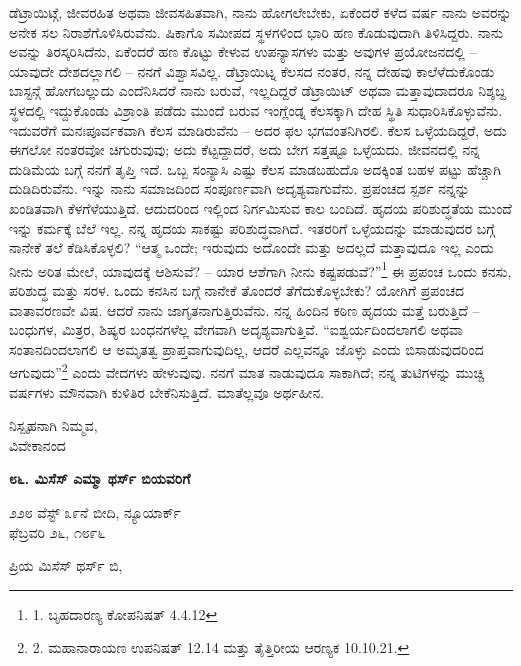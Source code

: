 ಡೆಟ್ರಾಯಿಟ್ಗೆ, ಜೀವರಹಿತ ಅಥವಾ ಜೀವಸಹಿತವಾಗಿ, ನಾನು ಹೋಗಲೇಬೇಕು, ಏಕೆಂದರೆ ಕಳೆದ ವರ್ಷ ನಾನು ಅವರನ್ನು ಅನೇಕ ಸಲ ನಿರಾಶೆಗೊಳಿಸಿರುವೆನು. ಷಿಕಾಗೊ ಸಮೀಪದ ಸ್ಥಳಗಳಿಂದ ಭಾರಿ ಹಣ ಕೊಡುವುದಾಗಿ ತಿಳಿಸಿದ್ದರು. ನಾನು ಅವನ್ನು ತಿರಸ್ಕರಿಸಿದೆನು, ಏಕೆಂದರೆ ಹಣ ಕೊಟ್ಟು ಕೇಳುವ ಉಪನ್ಯಾಸಗಳು ಮತ್ತು ಅವುಗಳ ಪ್ರಯೋಜನದಲ್ಲಿ – ಯಾವುದೇ ದೇಶದಲ್ಲಾಗಲಿ – ನನಗೆ ವಿಶ್ವಾಸವಿಲ್ಲ. ಡೆಟ್ರಾಯಿಟ್ನ ಕೆಲಸದ ನಂತರ, ನನ್ನ ದೇಹವು ಕಾಲೆಳೆದುಕೊಂಡು ಬಾಸ್ಟನ್ಗೆ ಹೋಗಬಲ್ಲುದು ಎಂದೆನಿಸಿದರೆ ನಾನು ಬರುವೆ, ಇಲ್ಲದಿದ್ದರೆ ಡೆಟ್ರಾಯಿಟ್ ಅಥವಾ ಮತ್ತಾವುದಾದರೂ ನಿಶ್ಶಬ್ದ ಸ್ಥಳದಲ್ಲಿ ಇದ್ದುಕೊಂಡು ವಿಶ್ರಾಂತಿ ಪಡೆದು ಮುಂದೆ ಬರುವ ಇಂಗ್ಲೆಂಡ್ನ ಕೆಲಸಕ್ಕಾಗಿ ದೇಹ ಸ್ಥಿತಿ ಸುಧಾರಿಸಿಕೊಳ್ಳುವೆನು. ಇದುವರೆಗೆ ಮನಃಪೂರ್ವಕವಾಗಿ ಕೆಲಸ ಮಾಡಿರುವೆನು – ಅದರ ಫಲ ಭಗವಂತನಿಗಿರಲಿ. ಕೆಲಸ ಒಳ್ಳೆಯದಿದ್ದರೆ, ಅದು ಈಗಲೋ ನಂತರವೋ ಚಿಗುರುವುವು; ಅದು ಕೆಟ್ಟದ್ದಾದರೆ, ಅದು ಬೇಗ ಸತ್ತಷ್ಟೂ ಒಳ್ಳೆಯದು. ಜೀವನದಲ್ಲಿ ನನ್ನ ದುಡಿಮೆಯ ಬಗ್ಗೆ ನನಗೆ ತೃಪ್ತಿ ಇದೆ. ಒಬ್ಬ ಸಂನ್ಯಾಸಿ ಎಷ್ಟು ಕೆಲಸ ಮಾಡಬಹುದೊ ಅದಕ್ಕಿಂತ ಬಹಳ ಪಟ್ಟು ಹೆಚ್ಚಾಗಿ ದುಡಿದಿರುವೆನು. ಇನ್ನು ನಾನು ಸಮಾಜದಿಂದ ಸಂಪೂರ್ಣವಾಗಿ ಅದೃಶ್ಯವಾಗುವೆನು. ಪ್ರಪಂಚದ ಸ್ಪರ್ಶ ನನ್ನನ್ನು ಖಂಡಿತವಾಗಿ ಕೆಳಗೆಳೆಯುತ್ತಿದೆ. ಆದುದರಿಂದ ಇಲ್ಲಿಂದ ನಿರ್ಗಮಿಸುವ ಕಾಲ ಬಂದಿದೆ. ಹೃದಯ ಪರಿಶುದ್ಧತೆಯ ಮುಂದೆ ಇನ್ನು ಕರ್ಮಕ್ಕೆ ಬೆಲೆ ಇಲ್ಲ. ನನ್ನ ಹೃದಯ ಸಾಕಷ್ಟು ಪರಿಶುದ್ಧವಾಗಿದೆ. ಇತರರಿಗೆ ಒಳ್ಳೆಯದನ್ನು ಮಾಡುವುದರ ಬಗ್ಗೆ ನಾನೇಕೆ ತಲೆ ಕೆಡಿಸಿಕೊಳ್ಳಲಿ? “ಆತ್ಮ ಒಂದೇ; ಇರುವುದು ಅದೊಂದೇ ಮತ್ತು ಅದಲ್ಲದೆ ಮತ್ತಾವುದೂ ಇಲ್ಲ ಎಂದು ನೀನು ಅರಿತ ಮೇಲೆ, ಯಾವುದಕ್ಕೆ ಆಶಿಸುವೆ? – ಯಾರ ಆಶೆಗಾಗಿ ನೀನು ಕಷ್ಟಪಡುವೆ?”\footnote{1. ಬೃಹದಾರಣ್ಯ ಕೋಪನಿಷತ್ 4.4.12} ಈ ಪ್ರಪಂಚ ಒಂದು ಕನಸು, ಪರಿಶುದ್ಧ ಮತ್ತು ಸರಳ. ಒಂದು ಕನಸಿನ ಬಗ್ಗೆ ನಾನೇಕೆ ತೊಂದರೆ ತೆಗೆದುಕೊಳ್ಳಬೇಕು? ಯೋಗಿಗೆ ಪ್ರಪಂಚದ ವಾತಾವರಣವೇ ವಿಷ. ಆದರೆ ನಾನು ಜಾಗೃತನಾಗುತ್ತಿರುವೆನು. ನನ್ನ ಹಿಂದಿನ ಕಠಿಣ ಹೃದಯ ಮತ್ತೆ ಬರುತ್ತಿದೆ – ಬಂಧುಗಳ, ಮಿತ್ರರ, ಶಿಷ್ಯರ ಬಂಧನಗಳೆಲ್ಲ ವೇಗವಾಗಿ ಅದೃಶ್ಯವಾಗುತ್ತಿವೆ. “ಐಶ್ವರ್ಯದಿಂದಲಾಗಲಿ ಅಥವಾ ಸಂತಾನದಿಂದಲಾಗಲಿ ಆ ಅಮೃತತ್ವ ಪ್ರಾಪ್ತವಾಗುವುದಿಲ್ಲ, ಆದರೆ ಎಲ್ಲವನ್ನೂ ಜೊಳ್ಳು ಎಂದು ಬಿಸಾಡುವುದರಿಂದ ಆಗುವುದು”\footnote{2. ಮಹಾನಾರಾಯಣ ಉಪನಿಷತ್ 12.14 ಮತ್ತು ತೈತ್ತಿರೀಯ ಆರಣ್ಯಕ 10.10.21.} ಎಂದು ವೇದಗಳು ಹೇಳುವುವು. ನನಗೆ ಮಾತ ನಾಡುವುದೂ ಸಾಕಾಗಿದೆ; ನನ್ನ ತುಟಿಗಳನ್ನು ಮುಚ್ಚಿ ವರ್ಷಗಳು ಮೌನವಾಗಿ ಕುಳಿತಿರ ಬೇಕೆನಿಸುತ್ತಿದೆ. ಮಾತೆಲ್ಲವೂ ಅರ್ಥಹೀನ.

\begin{flushright}
ನಿಸ್ಪೃಹನಾಗಿ ನಿಮ್ಮವ,\\ವಿವೇಕಾನಂದ
\end{flushright}

\begin{center}
\textbf{೮೬. ಮಿಸೆಸ್ ಎಮ್ಮಾ ಥರ್ಸ್ ಬಿಯವರಿಗೆ}
\end{center}

\begin{flushright}
೨೨೮ ವೆಸ್ಟ್ ೩೯ನೆ ಬೀದಿ, ನ್ಯೂಯಾರ್ಕ್\\ಫೆಬ್ರವರಿ ೨೬, ೧೮೯೬
\end{flushright}

ಪ್ರಿಯ ಮಿಸೆಸ್ ಥರ್ಸ್ ಬಿ,


